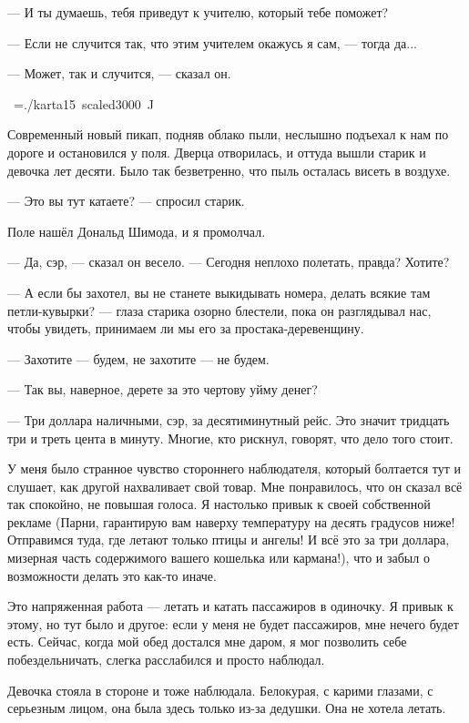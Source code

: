 --- И ты думаешь, тебя приведут к учителю, который тебе поможет?

--- Если не случится так, что этим учителем окажусь я сам, --- тогда да...

--- Может, так и случится, --- сказал он.

\vskip28pt
\hbox{\kern7cm \font\karta=./karta15 scaled3000 \karta ^^4a}
\vskip15pt

Современный новый пикап, подняв облако пыли, неслышно подъехал к нам по дороге и остановился у поля. Дверца отворилась, и оттуда вышли старик и девочка лет десяти. Было так безветренно, что пыль осталась висеть в воздухе.

--- Это вы тут катаете? --- спросил старик.

Поле нашёл Дональд Шимода, и я промолчал.

--- Да, сэр, --- сказал он весело. --- Сегодня неплохо полетать, правда? Хотите?

--- А если бы захотел, вы не станете выкидывать номера, делать всякие там петли-кувырки? --- глаза старика озорно блестели, пока он разглядывал нас, чтобы увидеть, принимаем ли мы его за простака-деревенщину.

--- Захотите --- будем, не захотите --- не будем.

--- Так вы, наверное, дерете за это чертову уйму денег?

--- Три доллара наличными, сэр, за десятиминутный рейс. Это значит тридцать три и треть цента в минуту. Многие, кто рискнул, говорят, что дело того стоит.

У меня было странное чувство стороннего наблюдателя, который болтается тут и слушает, как другой
нахваливает свой товар. Мне понравилось, что он сказал всё так спокойно, не повышая голоса. Я
настолько привык к своей собственной рекламе (Парни, гарантирую вам наверху температуру на десять
градусов ниже! Отправимся туда, где летают только птицы и ангелы! И всё это за три доллара, мизерная часть содержимого вашего кошелька или кармана!), что и забыл о возможности делать это как-то иначе.

Это напряженная работа --- летать и катать пассажиров в одиночку. Я привык к этому, но тут было и другое: если у меня не будет пассажиров, мне нечего будет есть. Сейчас, когда мой обед достался мне даром, я мог позволить себе побездельничать, слегка расслабился и просто наблюдал.

Девочка стояла в стороне и тоже наблюдала. Белокурая, с карими глазами, с серьезным лицом, она была здесь только из-за дедушки. Она не хотела летать.

